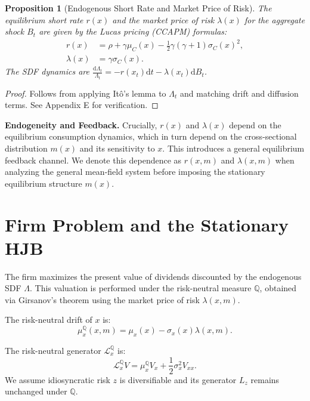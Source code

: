 \documentclass[11pt,letterpaper,oneside]{article}
\newtheorem{propositionT}{Proposition}
\newenvironment{proposition}[2]{\begin{propositionT}[#1]\label{prop:#2}}{\end{propositionT}}
\newcommand{\diff}{\mathrm{d}}
\newcommand{\LxQ}{\mathcal{L}_x^{\mathbb{Q}}}
\newcommand{\muxQ}{\mu_x^{\mathbb{Q}}}
\newcommand{\extbf}[1]{\textbf{#1}}
\begin{document}
\begin{proposition}{Endogenous Short Rate and Market Price of Risk}{pricing}
The equilibrium short rate $r(x)$ and the market price of risk $\lambda(x)$ for the aggregate shock $B_t$ are given by the Lucas pricing (CCAPM) formulas:
\begin{align*}
r(x) &= \rho + \gamma \mu_C(x) - \frac{1}{2}\gamma(\gamma+1)\sigma_C(x)^2, \\
\lambda(x) &= \gamma \sigma_C(x).
\end{align*}
The SDF dynamics are $\frac{\diff\Lambda_t}{\Lambda_t} = -r(x_t)\diff t - \lambda(x_t)\diff B_t$.
\end{proposition}
\begin{proof}
Follows from applying Itô's lemma to $\Lambda_t$ and matching drift and diffusion terms. See Appendix E for verification.
\end{proof}

\begin{tcolorbox}[didacticstyle]
  \extbf{Endogeneity and Feedback.} Crucially, $r(x)$ and $\lambda(x)$ depend on the equilibrium consumption dynamics, which in turn depend on the cross-sectional distribution $m(x)$ and its sensitivity to $x$. This introduces a general equilibrium feedback channel. We denote this dependence as $r(x,m)$ and $\lambda(x,m)$ when analyzing the general mean-field system before imposing the stationary equilibrium structure $m(x)$.
\end{tcolorbox}

\section{Firm Problem and the Stationary HJB}

The firm maximizes the present value of dividends discounted by the endogenous SDF $\Lambda$. This valuation is performed under the risk-neutral measure $\mathbb{Q}$, obtained via Girsanov's theorem using the market price of risk $\lambda(x,m)$.

The risk-neutral drift of $x$ is:
\begin{equation}\label{eq:muxQ}
\muxQ(x,m) = \mu_x(x) - \sigma_x(x)\lambda(x,m).
\end{equation}

The risk-neutral generator $\LxQ$ is:
\begin{equation}\label{eq:LxQ}
\LxQ V = \muxQ V_x + \frac{1}{2}\sigma_x^2 V_{xx}.
\end{equation}
We assume idiosyncratic risk $z$ is diversifiable and its generator $L_z$ remains unchanged under $\mathbb{Q}$.
\end{document}
